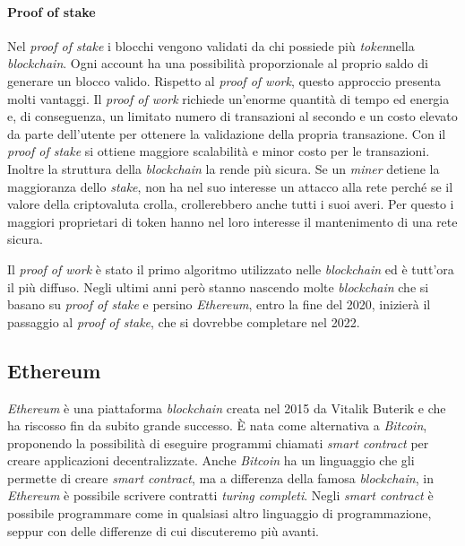 \paragraph{Proof of stake}
Nel \textit{proof of stake} i blocchi vengono validati da chi possiede più \emph{\gls{token}}\glsfirstoccur nella \textit{blockchain}. Ogni account ha una possibilità proporzionale al proprio saldo di generare un blocco valido. Rispetto al \textit{proof of work}, questo approccio presenta molti vantaggi. Il \textit{proof of work} richiede un'enorme quantità di tempo ed energia e, di conseguenza, un limitato numero di transazioni al secondo e un costo elevato da parte dell’utente per ottenere la validazione della propria transazione. Con il \textit{proof of stake} si ottiene maggiore scalabilità e minor costo per le transazioni.
Inoltre la struttura della \textit{blockchain} la rende più sicura. Se un \textit{miner} detiene la maggioranza dello \textit{stake}, non ha nel suo interesse un attacco alla rete perché se il valore della criptovaluta crolla, crollerebbero anche tutti i suoi averi. Per questo i maggiori proprietari di token hanno nel loro interesse il mantenimento di una rete sicura.

Il \textit{proof of work} è stato il primo algoritmo utilizzato nelle \textit{blockchain} ed è tutt’ora il più diffuso. Negli ultimi anni però stanno nascendo molte \textit{blockchain} che si basano su \textit{proof of stake} e persino \textit{Ethereum}, entro la fine del 2020, inizierà il passaggio al \textit{proof of stake}, che si dovrebbe completare nel 2022.

\subsection{Ethereum}
\textit{Ethereum} è una piattaforma \textit{blockchain} creata nel 2015 da Vitalik Buterik e che ha riscosso fin da subito grande successo.  È nata come alternativa a \textit{Bitcoin}, proponendo la possibilità di eseguire programmi chiamati \textit{smart contract} per creare applicazioni decentralizzate. Anche \textit{Bitcoin} ha un linguaggio che gli permette di creare \textit{smart contract}, ma a differenza della famosa \textit{blockchain}, in \textit{Ethereum} è possibile scrivere contratti \emph{\gls{turing completi}}\glsfirstoccur. Negli \textit{smart contract} è possibile programmare come in qualsiasi altro linguaggio di programmazione, seppur con delle differenze di cui discuteremo più avanti. 


